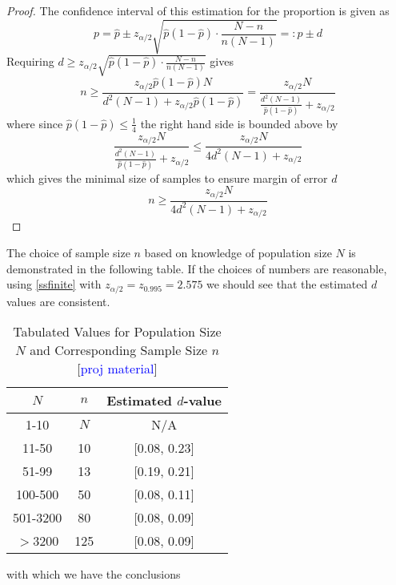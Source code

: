 \documentclass{article}
\def\unf#1{\textcolor{blue}{#1}}
\begin{document}
\begin{proof}
    The confidence interval of this estimation for the proportion is given as
    $$
    p = \hat{p}\pm z_{\alpha/2} \sqrt{\hat{p}(1-\hat{p})\cdot \dfrac{N-n}{n(N-1)}} =: \hat{p} \pm d
    $$
    Requiring $d\geq z_{\alpha/2} \sqrt{\hat{p}(1-\hat{p})\cdot \frac{N-n}{n(N-1)}}$ gives
    $$
    n\geq \dfrac{z_{\alpha/2}\hat{p}(1-\hat{p})N}{d^2(N-1)+z_{\alpha/2}\hat{p}(1-\hat{p})} = \dfrac{z_{\alpha/2}N}{\frac{d^2(N-1)}{\hat{p}(1-\hat{p})}+z_{\alpha/2}}
    $$
    where since $\hat{p}(1-\hat{p})\leq\frac{1}{4}$ the right hand side is bounded above by
    $$
    \dfrac{z_{\alpha/2}N}{\frac{d^2(N-1)}{\hat{p}(1-\hat{p})}+z_{\alpha/2}} \leq \dfrac{z_{\alpha/2}N}{4d^2(N-1)+z_{\alpha/2}}
    $$
    which gives the minimal size of samples to ensure margin of error $d$
    $$
    n\geq \dfrac{z_{\alpha/2}N}{4d^2(N-1)+z_{\alpha/2}}
    $$
\end{proof}

The choice of sample size $n$ based on knowledge of population size $N$ is demonstrated in the following table. If the choices of numbers are reasonable, using \eqref{ssfinite} with $z_{\alpha/2} = z_{0.995} = 2.575$ we should see that the estimated $d$ values are consistent. 

\begin{table}[htbp]
    \centering
    \begin{tabular}{ccc}
        \toprule
        $N$ & $n$ & Estimated $d$-value \\
        \midrule
        1-10 & $N$ & N/A \\
        11-50 & 10 & [0.08, 0.23] \\
        51-99 & 13 & [0.19, 0.21] \\
        100-500 & 50 & [0.08, 0.11]\\ 
        501-3200 & 80 & [0.08, 0.09]\\
        $>$3200 & 125 & [0.08, 0.09] \\
        \bottomrule
    \end{tabular}
    \caption{Tabulated Values for Population Size $N$ and Corresponding Sample Size $n$ [\unf{proj material}]}
\end{table}

with which we have the conclusions
\end{document}
